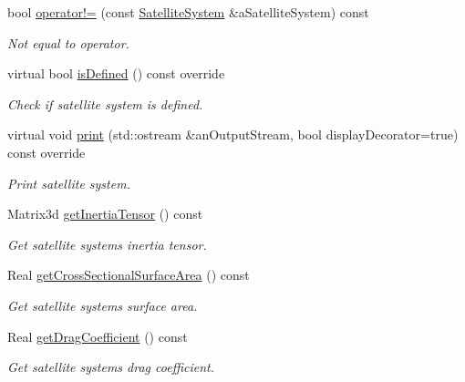 \begin{DoxyCompactItemize}
bool \hyperlink{classostk_1_1astro_1_1flight_1_1system_1_1_satellite_system_a67e71754b00cc21140555fd3632705e0}{operator!=} (const \hyperlink{classostk_1_1astro_1_1flight_1_1system_1_1_satellite_system}{Satellite\+System} \&a\+Satellite\+System) const
\begin{DoxyCompactList}\small\item\em Not equal to operator. \end{DoxyCompactList}\item 
virtual bool \hyperlink{classostk_1_1astro_1_1flight_1_1system_1_1_satellite_system_a6d10fc37776cc87a74fe8b7e2ccb9843}{is\+Defined} () const override
\begin{DoxyCompactList}\small\item\em Check if satellite system is defined. \end{DoxyCompactList}\item 
virtual void \hyperlink{classostk_1_1astro_1_1flight_1_1system_1_1_satellite_system_a0d4ca06c426773f667018581945dbf57}{print} (std\+::ostream \&an\+Output\+Stream, bool display\+Decorator=true) const override
\begin{DoxyCompactList}\small\item\em Print satellite system. \end{DoxyCompactList}\item 
Matrix3d \hyperlink{classostk_1_1astro_1_1flight_1_1system_1_1_satellite_system_a5b4919deec7bbc637878f553542490b2}{get\+Inertia\+Tensor} () const
\begin{DoxyCompactList}\small\item\em Get satellite system\textquotesingle{}s inertia tensor. \end{DoxyCompactList}\item 
Real \hyperlink{classostk_1_1astro_1_1flight_1_1system_1_1_satellite_system_ac857e04d890280e233c89037a61044d9}{get\+Cross\+Sectional\+Surface\+Area} () const
\begin{DoxyCompactList}\small\item\em Get satellite system\textquotesingle{}s surface area. \end{DoxyCompactList}\item 
Real \hyperlink{classostk_1_1astro_1_1flight_1_1system_1_1_satellite_system_a4e6dcdae45be7ead5fe0924a540ae2cd}{get\+Drag\+Coefficient} () const
\begin{DoxyCompactList}\small\item\em Get satellite system\textquotesingle{}s drag coefficient. \end{DoxyCompactList}\end{DoxyCompactItemize}
